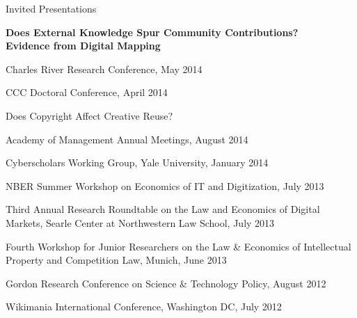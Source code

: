 \documentclass{resume} %
\begin{document}
\begin{rSection}{Invited Presentations}

\begin{rSubsection}{\bf Does External Knowledge Spur Community Contributions? \\Evidence from Digital Mapping}{}{}{}
\item Charles River Research Conference, May 2014
\item CCC Doctoral Conference, April 2014
\end{rSubsection}


\begin{rSubsection}{Does Copyright Affect Creative Reuse?}{}{}{}
\item Academy of Management Annual Meetings, August 2014
\item Cyberscholars Working Group, Yale University, January 2014
\item NBER Summer Workshop on Economics of IT and Digitization, July 2013
\item Third Annual Research Roundtable on the Law and Economics of Digital Markets, Searle Center at Northwestern Law School, July 2013
\item Fourth Workshop for Junior Researchers on the Law \& Economics of Intellectual Property and Competition Law, Munich, June 2013
\item Gordon Research Conference on Science \& Technology Policy, August 2012
\item Wikimania International Conference, Washington DC, July 2012 
\end{rSubsection}

\end{rSection}


\end{document}
